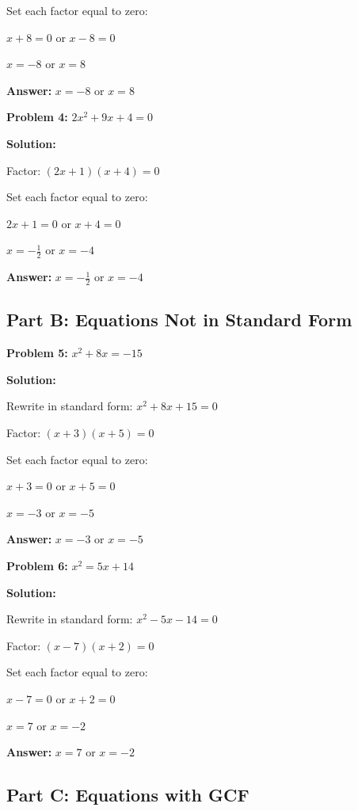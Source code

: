 \documentclass[12pt]{article}
\begin{document}
		Set each factor equal to zero:
		
		$x + 8 = 0$ or $x - 8 = 0$
		
		$x = -8$ or $x = 8$
		
		\textbf{Answer:} $x = -8$ or $x = 8$

		\vspace{0.5cm}

		\textbf{Problem 4:} $2x^2 + 9x + 4 = 0$
		
		\textbf{Solution:}
		
		Factor: $(2x + 1)(x + 4) = 0$
		
		Set each factor equal to zero:
		
		$2x + 1 = 0$ or $x + 4 = 0$
		
		$x = -\frac{1}{2}$ or $x = -4$
		
		\textbf{Answer:} $x = -\frac{1}{2}$ or $x = -4$

	\newpage

	\subsection*{Part B: Equations Not in Standard Form}

		\textbf{Problem 5:} $x^2 + 8x = -15$
		
		\textbf{Solution:}
		
		Rewrite in standard form: $x^2 + 8x + 15 = 0$
		
		Factor: $(x + 3)(x + 5) = 0$
		
		Set each factor equal to zero:
		
		$x + 3 = 0$ or $x + 5 = 0$
		
		$x = -3$ or $x = -5$
		
		\textbf{Answer:} $x = -3$ or $x = -5$

		\vspace{0.5cm}

		\textbf{Problem 6:} $x^2 = 5x + 14$
		
		\textbf{Solution:}
		
		Rewrite in standard form: $x^2 - 5x - 14 = 0$
		
		Factor: $(x - 7)(x + 2) = 0$
		
		Set each factor equal to zero:
		
		$x - 7 = 0$ or $x + 2 = 0$
		
		$x = 7$ or $x = -2$
		
		\textbf{Answer:} $x = 7$ or $x = -2$

	\subsection*{Part C: Equations with GCF}
\end{document}
